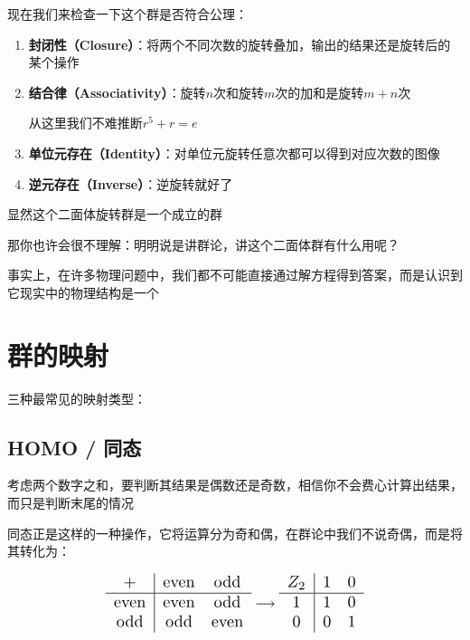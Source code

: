 \documentclass[UTF8]{ctexbook}
\begin{document}
现在我们来检查一下这个群是否符合公理：

\begin{enumerate}
  \item \textbf{封闭性（Closure）}：将两个不同次数的旋转叠加，输出的结果还是旋转后的某个操作

  \item \textbf{结合律（Associativity）}：旋转$n$次和旋转$m$次的加和是旋转$m+n$次

  从这里我们不难推断$r^5 + r = e$

  \item \textbf{单位元存在（Identity）}：对单位元旋转任意次都可以得到对应次数的图像

  \item \textbf{逆元存在（Inverse）}：逆旋转就好了
\end{enumerate}

显然这个二面体旋转群是一个成立的群

那你也许会很不理解：明明说是讲群论，讲这个二面体群有什么用呢？

事实上，在许多物理问题中，我们都不可能直接通过解方程得到答案，而是认识到它现实中的物理结构是一个

\newpage
\section{群的映射}

三种最常见的映射类型：

\subsection{HOMO / 同态}

考虑两个数字之和，要判断其结果是偶数还是奇数，相信你不会费心计算出结果，而只是判断末尾的情况

同态正是这样的一种操作，它将运算分为奇和偶，在群论中我们不说奇偶，而是将其转化为：

\[
\scalebox{1.3}{$
\begin{array}{c|cc}
+ & \text{even} & \text{odd} \\
\hline
\text{even} & \text{even} & \text{odd} \\
\text{odd} & \text{odd} & \text{even}
\end{array}
$}
\longrightarrow 
\scalebox{1.3}{$
\begin{array}{c|cc}
Z_2 & \text{1} & \text{0} \\
\hline
\text{1} & \text{1} & \text{0} \\
\text{0} & \text{0} & \text{1}
\end{array}
$}
\]
\end{document}
